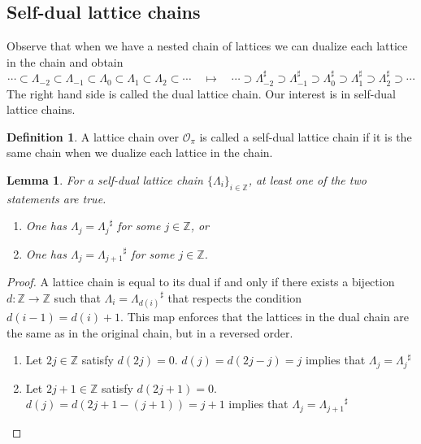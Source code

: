 \documentclass{eptcs}
\newtheorem{lemma}[theorem]{Lemma}
\theoremstyle{remark}
\theoremstyle{definition}
\newtheorem{definition}[theorem]{Definition}
\providecommand{\tightlist}{%
  \setlength{\itemsep}{0pt}\setlength{\parskip}{0pt}}
\newcommand{\dual}[1]{{#1}^{\sharp}}
\begin{document}
\subsection{Self-dual lattice chains}


Observe that when we have a nested chain of lattices we can dualize each lattice in the chain and obtain
\begin{equation}
    \cdots \subset \Lambda_{-2} \subset \Lambda_{-1} \subset \Lambda_{0} \subset \Lambda_{1} \subset  \Lambda_{2} \subset \cdots \quad \longmapsto \quad
    	\cdots \supset \dual{\Lambda}_{-2} \supset \dual{\Lambda}_{-1} \supset \dual{\Lambda}_{0} \supset \dual{\Lambda}_{1} \supset  \dual{\Lambda}_{2} \supset \cdots
\end{equation}
The right hand side is called the dual lattice chain.
Our interest is in self-dual lattice chains. 
\begin{definition}
A lattice chain over $\mathcal{O}_{\pi}$ is called a self-dual lattice chain if it is the same chain when we dualize each lattice in the chain.
\end{definition}

\begin{lemma}
    \label{selfdual_oradjacent}
    For a self-dual lattice chain $\{\Lambda_i\}_{i \in \mathbb{Z}}$, at least one of the two statements are true.
\begin{enumerate}
\tightlist
    \item One has $\Lambda_j = \dual{\Lambda_j}$ for some $j \in \mathbb{Z}$, or
    \item One has $\Lambda_j = \dual{\Lambda_{j+1}}$ for some $j \in \mathbb{Z}$.
\end{enumerate}
\end{lemma}
\begin{proof}

    A lattice chain is equal to its dual if and only if there exists a bijection $d: \mathbb{Z} \rightarrow \mathbb{Z}$ such that $\Lambda_{i} = \dual{\Lambda_{d(i)}}$ that respects the condition $d(i-1) = d(i)+1$. This map enforces that the lattices in the dual chain are the same as in the original chain, but in a reversed order. 
    \begin{enumerate}
    \tightlist
        \item Let $2j \in \mathbb{Z}$ satisfy $d(2j) = 0$.  $d(j) = d(2j - j)= j$ implies that $\Lambda_j = \dual{\Lambda_j}$ 
        \item Let $2j +1 \in \mathbb{Z}$ satisfy $d(2j+1) = 0$.  $d(j) = d(2j +1 - (j+1))= j+1$ implies that $\Lambda_j = \dual{\Lambda_{j+1}}$ 
    \end{enumerate} 
\end{proof}
\end{document}
